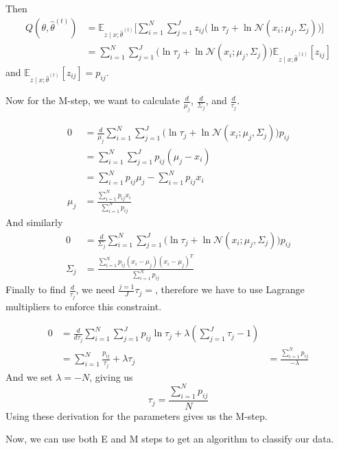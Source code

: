 \documentclass[]{article}
\newcommand{\thetahat}{\hat{\theta}^{(t)}}
\begin{document}
Then
\begin{align*}
Q(\theta, \thetahat) &= \mathbb{E}_{z \mid x; \thetahat}
\Bigg[ \sum_{i=1}^N\sum_{j=1}^J z_{ij}\Big(\ln\tau_j + \ln \mathcal{N}(x_i; \mu_j, \Sigma_j)\Big)\Bigg]\\
&=  \sum_{i=1}^N\sum_{j=1}^J \Big(\ln\tau_j + \ln \mathcal{N}(x_i; \mu_j, \Sigma_j)\Big)\mathbb{E}_{z \mid x; \thetahat}[z_{ij}]
\end{align*}
and $\mathbb{E}_{z \mid x; \thetahat}[z_{ij}] = p_{ij}$.

Now for the M-step, we want to calculate $\frac{d}{\mu_j}$, $\frac{d}{\Sigma_j}$, and $\frac{d}{\tau_j}$.

\begin{align*}
0 &= \frac{d}{\mu_j} \sum_{i=1}^N\sum_{j=1}^J \Big(\ln\tau_j + \ln \mathcal{N}(x_i; \mu_j, \Sigma_j)\Big) p_{ij}\\
&= \sum_{i=1}^N\sum_{j=1}^J p_{ij} (\mu_j - x_{i})\\
&= \sum_{i=1}^N p_{ij}\mu_j - \sum_{i=1}^N p_{ij}x_{i}\\
\mu_j &= \frac{\sum_{i=1}^N p_{ij}x_{i}}{\sum_{i=1}^N p_{ij}}
\end{align*}
And similarly
\begin{align*}
0 &= \frac{d}{\Sigma_j} \sum_{i=1}^N\sum_{j=1}^J \Big(\ln\tau_j + \ln \mathcal{N}(x_i; \mu_j, \Sigma_j)\Big) p_{ij}\\
\Sigma_j &= \frac{\sum_{i=1}^N p_{ij}(x_i - \mu_j)(x_i - \mu_j)^T}{\sum_{i=1}^N p_{ij}}
\end{align*}
Finally to find $\frac{d}{\tau_j}$, we need $\frac{j=1}{J} \tau_j = $, therefore we have to use Lagrange multipliers to enforce this constraint. 

\begin{align*}
0 &= \frac{d}{d \tau_j} \sum_{i=1}^{N}\sum_{j=1}^J p_{ij} \ln \tau_j + \lambda (\sum_{j=1}^J \tau_j - 1)\\
&= \sum_{i=1}^N \frac{p_{ij}}{\tau_j} + \lambda 
\tau_j &= \frac{\sum_{i=1}^N p_{ij}}{-\lambda}
\end{align*}
And we set $\lambda = -N$, giving us
$$\tau_j = \frac{\sum_{i=1}^N p_{ij}}{N}$$
Using these derivation for the parameters gives us the M-step. 

Now, we can use both E and M steps to get an algorithm to classify our data. 
\end{document}
